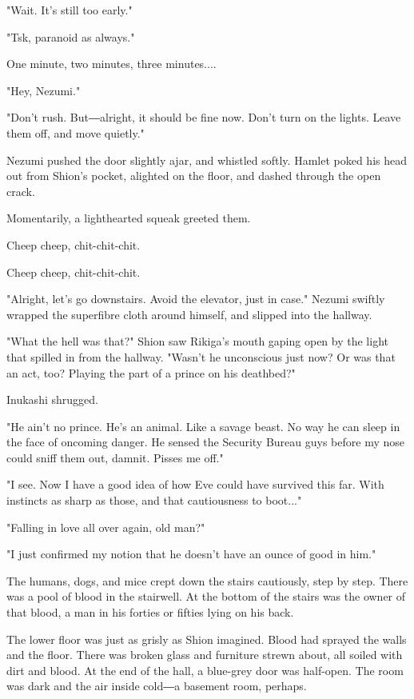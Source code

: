 "Wait. It's still too early."

"Tsk, paranoid as always."

One minute, two minutes, three minutes....

"Hey, Nezumi."

"Don't rush. But―alright, it should be fine now. Don't turn on the
lights. Leave them off, and move quietly."

Nezumi pushed the door slightly ajar, and whistled softly. Hamlet poked
his head out from Shion's pocket, alighted on the floor, and dashed
through the open crack.

Momentarily, a lighthearted squeak greeted them.

Cheep cheep, chit-chit-chit.

Cheep cheep, chit-chit-chit.

"Alright, let's go downstairs. Avoid the elevator, just in case." Nezumi
swiftly wrapped the superfibre cloth around himself, and slipped into
the hallway.

"What the hell was that?" Shion saw Rikiga's mouth gaping open by the
light that spilled in from the hallway. "Wasn't he unconscious just now?
Or was that an act, too? Playing the part of a prince on his deathbed?"

Inukashi shrugged.

"He ain't no prince. He's an animal. Like a savage beast. No way he can
sleep in the face of oncoming danger. He sensed the Security Bureau guys
before my nose could sniff them out, damnit. Pisses me off."

"I see. Now I have a good idea of how Eve could have survived this far.
With instincts as sharp as those, and that cautiousness to boot..."

"Falling in love all over again, old man?"

"I just confirmed my notion that he doesn't have an ounce of good in
him."

The humans, dogs, and mice crept down the stairs cautiously, step by
step. There was a pool of blood in the stairwell. At the bottom of the
stairs was the owner of that blood, a man in his forties or fifties
lying on his back.

The lower floor was just as grisly as Shion imagined. Blood had sprayed
the walls and the floor. There was broken glass and furniture strewn
about, all soiled with dirt and blood. At the end of the hall, a
blue-grey door was half-open. The room was dark and the air inside
cold―a basement room, perhaps.

